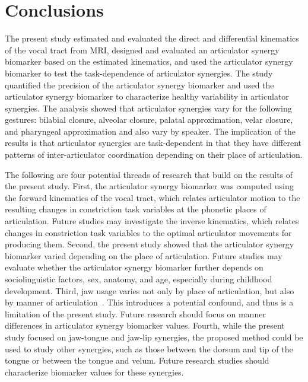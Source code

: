 \documentclass[reprint]{JASAnew}\usepackage[]{graphicx}\usepackage[]{color}
\begin{document}
\section{Conclusions}
\label{sec:conclusions}

The present study estimated and evaluated the direct and differential kinematics of the vocal tract from MRI, 
%
designed and evaluated an articulator synergy biomarker based on the estimated kinematics, and
%
used the articulator synergy biomarker to test the task-dependence of articulator synergies.
%
The study quantified the precision of the articulator synergy biomarker and used the articulator synergy biomarker to characterize healthy variability in articulator synergies. 
%
The analysis showed that articulator synergies vary for the following gestures: bilabial closure, alveolar closure, palatal approximation, velar closure, and pharyngeal approximation and also vary by speaker. 
%
The implication of the results is that articulator synergies are task-dependent in that they have different patterns of inter-articulator coordination depending on their place of articulation. 



The following are four potential threads of research that build on the results of the present study.
%
First, the articulator synergy biomarker was computed using the forward kinematics of the vocal tract, which relates articulator motion to the resulting changes in constriction task variables at the phonetic places of articulation. Future studies may investigate the inverse kinematics, which relates changes in constriction task variables to the optimal articulator movements for producing them. 
%
Second, the present study showed that the articulator synergy biomarker varied depending on the place of articulation. Future studies may evaluate whether the articulator synergy biomarker further depends on sociolinguistic factors, sex, anatomy, and age, especially during childhood development.
%
Third, jaw usage varies not only by place of articulation, but also by manner of articulation~\cite{vatikiotis1995analysis}. This introduces a potential confound, and thus is a limitation of the present study. Future research should focus on manner differences in articulator synergy biomarker values.
%
Fourth, while the present study focused on jaw-tongue and jaw-lip synergies, the proposed method could be used to study other synergies, such as those between the dorsum and tip of the tongue or between the tongue and velum. Future research studies should characterize biomarker values for these synergies.
\end{document}
